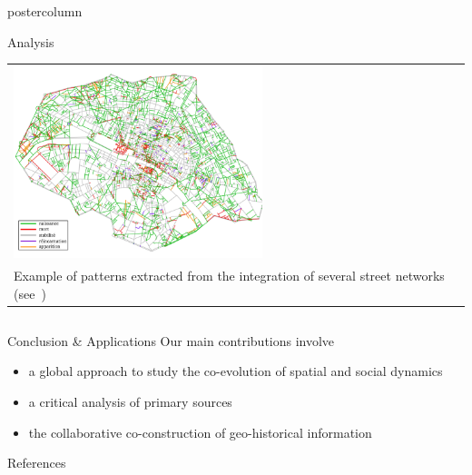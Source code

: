 \documentclass[final,hyperref={pdfpagelabels=false}]{beamer}
\let\oldcite=\cite
\renewcommand{\cite}[1]{\textcolor{ta3chameleon}{\oldcite{#1}}}
\begin{document}
\begin{frame}
\begin{columns}
\begin{column}{0.5\textwidth}
\begin{beamercolorbox}[center,wd=\textwidth]{postercolumn}
\begin{minipage}[t]{.98\textwidth}
\begin{block}{Analysis}
	\begin{tabular}{>{\centering}m{}}
	  \includegraphics[width=0.56\textwidth]{figures/patterns}\\
	  Example of patterns extracted from the integration of several street networks (see~\cite{Costes2015_,Costes2016PhD})\\
        \end{tabular}
      \end{block}
    \end{minipage}
    \end{beamercolorbox}
    \end{column}
  \end{columns}
  \begin{block}{Conclusion \& Applications}
    Our main contributions involve
    \begin{itemize}
    \item a \textcolor{ta3orange}{global approach} to study the co-evolution of spatial and social dynamics~\cite{Dumenieu2013a, Dumenieu2015PhD}
    \item a \textcolor{ta3orange}{critical analysis} of \textcolor{ta3orange}{primary sources}~\cite{Costes2015_, Dumenieu2015PhD, Costes2016PhD, Dumenieu2018}
    \item the \textcolor{ta3orange}{collaborative co-construction} of geo-historical information~\cite{Perret2015_, Perret2015Data_, Cura2018}
    \end{itemize}
  \end{block}
  \begin{block}{References}
    \vspace*{-1em}
	\begin{multicols}{2}
		\tiny
		
		
	\end{multicols}
  \end{block}
\end{frame}
\end{document}
